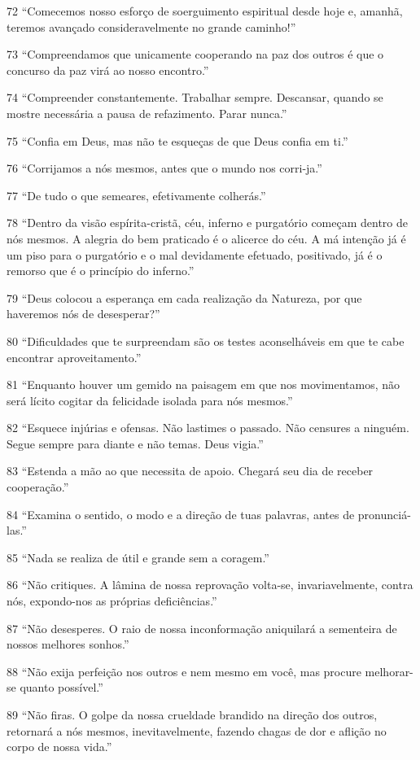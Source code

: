72 ``Comecemos nosso esforço de soerguimento espiritual desde hoje e, amanhã, teremos avançado consideravelmente no grande caminho!”

73 ``Compreendamos que unicamente cooperando na paz dos outros é que o concurso da paz virá ao nosso encontro.”

74 ``Compreender constantemente. Trabalhar sempre. Descansar, quando se mostre necessária a pausa de refazimento. Parar nunca.”

75 ``Confia em Deus, mas não te esqueças de que Deus confia em ti.”

76 ``Corrijamos a nós mesmos, antes que o mundo nos corri-ja.”

77 ``De tudo o que semeares, efetivamente colherás.”

78 ``Dentro da visão espírita-cristã, céu, inferno e purgatório começam dentro de nós mesmos. A alegria do bem praticado é o alicerce do céu. A má intenção já é um piso para o purgatório e o mal devidamente efetuado, positivado, já é o remorso que é o princípio do inferno.”

79 ``Deus colocou a esperança em cada realização da Natureza, por que haveremos nós de desesperar?”

80 ``Dificuldades que te surpreendam são os testes aconselháveis em que te cabe encontrar aproveitamento.”

81 ``Enquanto houver um gemido na paisagem em que nos movimentamos, não será lícito cogitar da felicidade isolada para nós mesmos.”

82 ``Esquece injúrias e ofensas. Não lastimes o passado. Não censures a ninguém. Segue sempre para diante e não temas. Deus vigia.”

83 ``Estenda a mão ao que necessita de apoio. Chegará seu dia de receber cooperação.”

84 ``Examina o sentido, o modo e a direção de tuas palavras, antes de pronunciá-las.”

85 ``Nada se realiza de útil e grande sem a coragem.”

86 ``Não critiques. A lâmina de nossa reprovação volta-se, invariavelmente, contra nós, expondo-nos as próprias deficiências.”

87 ``Não desesperes. O raio de nossa inconformação aniquilará a sementeira de nossos melhores sonhos.”

88 ``Não exija perfeição nos outros e nem mesmo em você, mas procure melhorar-se quanto possível.”

89 ``Não firas. O golpe da nossa crueldade brandido na direção dos outros, retornará a nós mesmos, inevitavelmente, fazendo chagas de dor e aflição no corpo de nossa vida.”

